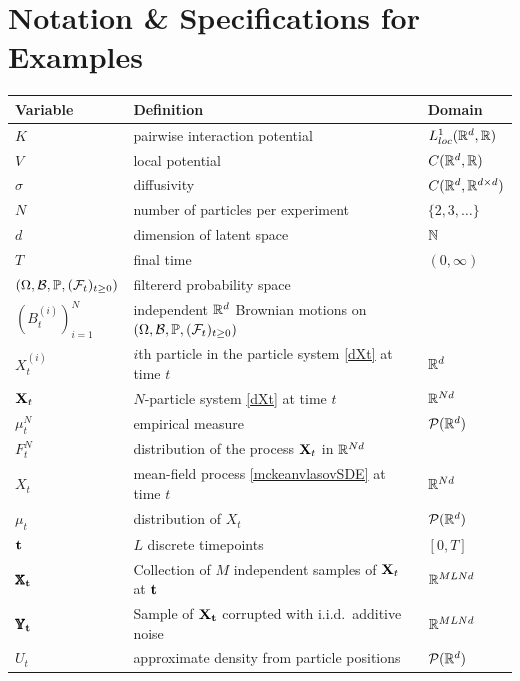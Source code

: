 \documentclass[english,reqno]{amsart}
\begin{document}
\appendix

\section{Notation \& Specifications for Examples}\label{app:specs}

{\small \begin{table}
\begin{center}
\begin{tabular}{|p{2.8cm}p{10cm}p{3.5cm}|}
\hline Variable & Definition & Domain \\ \hline
$K$ & pairwise interaction potential & $L^1_{loc}(\mathbb{R}^d,\mathbb{R})$ \\ \hline
$V$ & local potential & $C(\mathbb{R}^d,\mathbb{R})$ \\ \hline
$\sigma$ & diffusivity & $C(\mathbb{R}^d,\mathbb{R}^{d\times d})$ \\ \hline
$N$ & number of particles per experiment & $\{2,3,\dots\}$ \\ \hline
$d$ & dimension of latent space & $\mathbb{N}$ \\ \hline
$T$ & final time & $(0,\infty)$ \\ \hline
$(\Omega,{\mathcal{B}},\mathbb{P},({\mathcal{F}}_t)_{t\geq 0})$ & filtererd probability space & \\  \hline
$(B^{(i)}_t)_{i=1}^N$ & independent $\mathbb{R}^d$ Brownian motions on $(\Omega,{\mathcal{B}},\mathbb{P},({\mathcal{F}}_t)_{t\geq 0})$ & \\  \hline
$X^{(i)}_t$ & $i$th particle in the particle system \eqref{dXt} at time $t$ & $\mathbb{R}^d$ \\ \hline
$\mathbf{X}_t$ & $N$-particle system \eqref{dXt} at time $t$ & $\mathbb{R}^{Nd}$ \\ \hline
$\mu^N_t$ & empirical measure & ${\mathcal{P}}(\mathbb{R}^d)$\\ \hline
$F^N_t$ & distribution of the process $\mathbf{X}_t$ in $\mathbb{R}^{Nd}$ & \\ \hline
$X_t$ & mean-field process \eqref{mckeanvlasovSDE} at time $t$ & $\mathbb{R}^{Nd}$ \\ \hline
$\mu_t$ & distribution of $X_t$ & ${\mathcal{P}}(\mathbb{R}^d)$\\ \hline
$\mathbf{t}$ & $L$ discrete timepoints & $[0,T]$ \\ \hline
$\pmb{\mathbb{X}}_{\mathbf{t}}$ & Collection of $M$ independent samples of $\mathbf{X}_t$ at $\mathbf{t}$ & $\mathbb{R}^{MLNd}$ \\ \hline
$\pmb{\mathbb{Y}}_{\mathbf{t}}$ & Sample of $\mathbf{X}_{\mathbf{t}}$ corrupted with i.i.d.\ additive noise & $\mathbb{R}^{MLNd}$ \\ \hline
$U_t$ & approximate density from particle positions & ${\mathcal{P}}(\mathbb{R}^d)$ \\ \hline

\end{tabular}
\end{center}
\end{table}}
\end{document}
